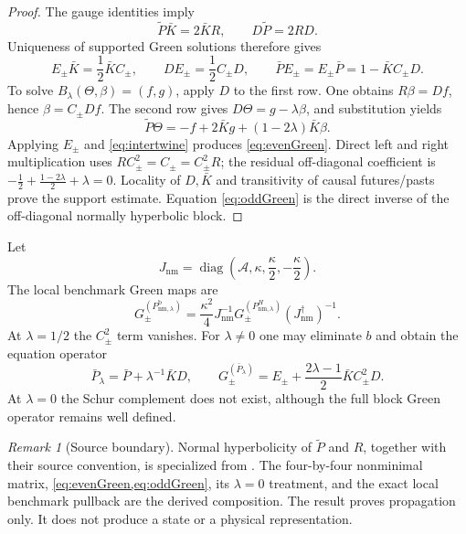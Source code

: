 \documentclass[11pt]{article}
\theoremstyle{definition}
\theoremstyle{remark}
\newtheorem{remark}[theorem]{Remark}
\newcommand{\cA}{\mathcal A}
\begin{document}
\begin{proof}
The gauge identities imply
\begin{equation}
 \widetilde P\bar K=2\bar K R,
 \qquad D\widetilde P=2RD.
\end{equation}
Uniqueness of supported Green solutions therefore gives
\begin{equation}
 E_\pm\bar K=\frac12\bar K C_\pm,
 \qquad DE_\pm=\frac12C_\pm D,
 \qquad
 \bar P E_\pm=E_\pm\bar P=1-\bar K C_\pm D.
 \label{eq:intertwine}
\end{equation}
To solve $B_\lambda(\Theta,\beta)=(f,g)$, apply $D$ to the first row.  One obtains
$R\beta=Df$, hence $\beta=C_\pm Df$.  The second row gives
$D\Theta=g-\lambda\beta$, and substitution yields
\begin{equation}
 \widetilde P\Theta=-f+2\bar K g+(1-2\lambda)\bar K\beta.
\end{equation}
Applying $E_\pm$ and \cref{eq:intertwine} produces \cref{eq:evenGreen}.  Direct
left and right multiplication uses $RC_\pm^2=C_\pm=C_\pm^2R$; the residual
off-diagonal coefficient is
$-\tfrac12+\tfrac{1-2\lambda}{2}+\lambda=0$.
Locality of $D,\bar K$ and transitivity of causal futures/pasts prove the support
estimate.  Equation \cref{eq:oddGreen} is the direct inverse of the off-diagonal
normally hyperbolic block.
\end{proof}

Let
\begin{equation}
 J_{\mathrm{nm}}=\operatorname{diag}
 \left(\cA,\kappa,\frac{\kappa}{2},-\frac{\kappa}{2}\right).
\end{equation}
The local benchmark Green maps are
\begin{equation}
 G_\pm^{(P_{\mathrm{nm},\lambda}^{\mathrm{b}})}
 =\frac{\kappa^2}{4}J_{\mathrm{nm}}^{-1}
 G_\pm^{(P_{\mathrm{nm},\lambda}^{H})}(J_{\mathrm{nm}}^\dagger)^{-1}.
 \label{eq:LBGreenpull}
\end{equation}
At $\lambda=1/2$ the $C_\pm^2$ term vanishes.  For $\lambda\neq0$ one may eliminate
$b$ and obtain the equation operator
\begin{equation}
 \bar P_\lambda=\bar P+\lambda^{-1}\bar K D,
 \qquad
 G_\pm^{(\bar P_\lambda)}=E_\pm+\frac{2\lambda-1}{2}\bar K C_\pm^2D.
\end{equation}
At $\lambda=0$ the Schur complement does not exist, although the full block Green
operator remains well defined.

\begin{remark}[Source boundary]
Normal hyperbolicity of $\widetilde P$ and $R$, together with their source convention,
is specialized from \cite{Hack2014}.  The four-by-four nonminimal matrix,
\cref{eq:evenGreen,eq:oddGreen}, its $\lambda=0$ treatment, and the exact local benchmark pullback
are the derived composition.  The result proves propagation only.  It does not produce
a state or a physical representation.
\end{remark}
\end{document}
